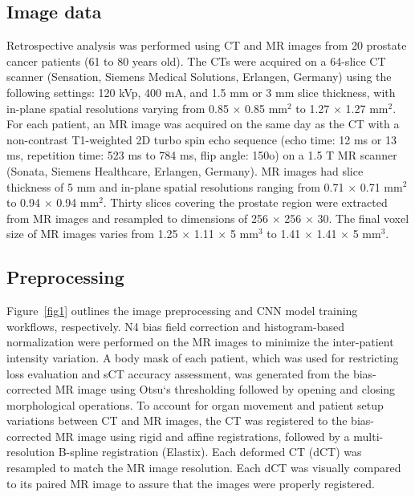 \subsection{Image data}  
Retrospective analysis was performed using CT and MR images from 20 prostate cancer patients (61 to 80 years old). The CTs were acquired on a 64-slice CT scanner (Sensation, Siemens Medical Solutions, Erlangen, Germany) using the following settings: 120 kVp, 400 mA, and 1.5 mm or 3 mm slice thickness, with in-plane spatial resolutions varying from 0.85 $\times$ 0.85 mm$^{2}$ to 1.27 $\times$ 1.27 mm$^{2}$. For each patient, an MR image was acquired on the same day as the CT with a non-contrast T1-weighted 2D turbo spin echo sequence (echo time: 12 ms or 13 ms, repetition time: 523 ms to 784 ms, flip angle: 150o) on a 1.5 T MR scanner (Sonata, Siemens Healthcare, Erlangen, Germany). MR images had slice thickness of 5 mm and in-plane spatial resolutions ranging from 0.71 $\times$ 0.71 mm$^{2}$ to 0.94 $\times$ 0.94 mm$^{2}$.  Thirty slices covering the prostate region were extracted from MR images and resampled to dimensions of 256 $\times$ 256 $\times$ 30. The final voxel size of MR images varies from 1.25 $\times$ 1.11 $\times$ 5 mm$^{3}$ to 1.41 $\times$ 1.41 $\times$ 5 mm$^{3}$.


\subsection{Preprocessing}  %
Figure~\ref{fig1} outlines the image preprocessing and CNN model training workflows, respectively. N4 bias field correction\cite{RN30} and histogram-based normalization\cite{RN31} were performed on the MR images to minimize the inter-patient intensity variation. A body mask of each patient, which was used for restricting loss evaluation and sCT accuracy assessment, was generated from the bias-corrected MR image using Otsu`s thresholding\cite{RN32} followed by opening and closing morphological operations. To account for organ movement and patient setup variations between CT and MR images, the CT was registered to the bias-corrected MR image using rigid and affine registrations, followed by a multi-resolution B-spline registration (Elastix\cite{RN33}). Each deformed CT (dCT) was resampled to match the MR image resolution. Each dCT was visually compared to its paired MR image to assure that the images were properly registered.


